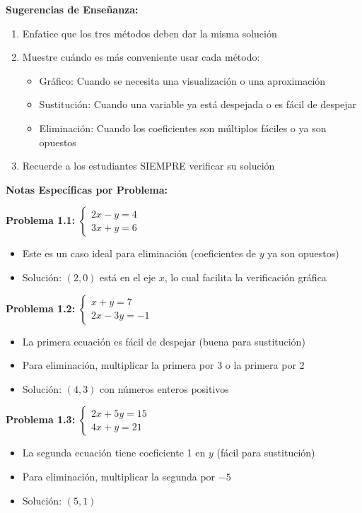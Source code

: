 \textbf{Sugerencias de Enseñanza:}

\begin{enumerate}
    \item Enfatice que los tres métodos deben dar la misma solución
    \item Muestre cuándo es más conveniente usar cada método:
    \begin{itemize}
        \item Gráfico: Cuando se necesita una visualización o una aproximación
        \item Sustitución: Cuando una variable ya está despejada o es fácil de despejar
        \item Eliminación: Cuando los coeficientes son múltiplos fáciles o ya son opuestos
    \end{itemize}
    \item Recuerde a los estudiantes SIEMPRE verificar su solución
\end{enumerate}

\textbf{Notas Específicas por Problema:}

\textbf{Problema 1.1:} $\begin{cases}2x - y = 4 \\ 3x + y = 6\end{cases}$
\begin{itemize}
    \item Este es un caso ideal para eliminación (coeficientes de $y$ ya son opuestos)
    \item Solución: $(2, 0)$ está en el eje $x$, lo cual facilita la verificación gráfica
\end{itemize}

\textbf{Problema 1.2:} $\begin{cases}x + y = 7 \\ 2x - 3y = -1\end{cases}$
\begin{itemize}
    \item La primera ecuación es fácil de despejar (buena para sustitución)
    \item Para eliminación, multiplicar la primera por 3 o la primera por 2
    \item Solución: $(4, 3)$ con números enteros positivos
\end{itemize}

\textbf{Problema 1.3:} $\begin{cases}2x + 5y = 15 \\ 4x + y = 21\end{cases}$
\begin{itemize}
    \item La segunda ecuación tiene coeficiente 1 en $y$ (fácil para sustitución)
    \item Para eliminación, multiplicar la segunda por $-5$
    \item Solución: $(5, 1)$
\end{itemize}

